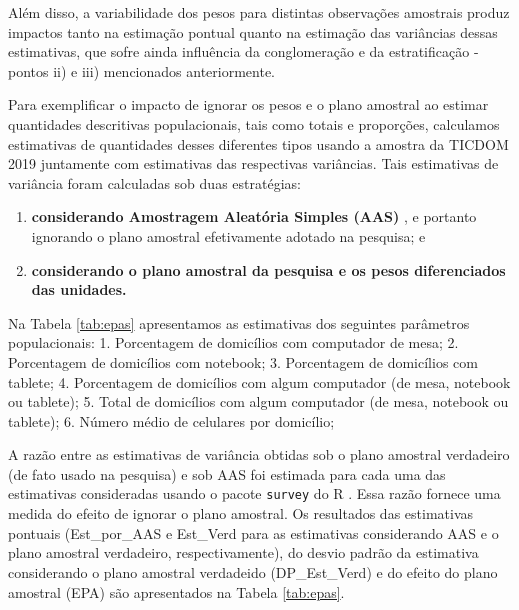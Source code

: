 \documentclass[
]{book}
\begin{document}
Além disso, a variabilidade dos pesos para distintas observações amostrais
produz impactos tanto na estimação pontual quanto na estimação das variâncias dessas estimativas, que sofre ainda influência da conglomeração e da estratificação - pontos ii) e iii) mencionados anteriormente.

Para exemplificar o impacto de ignorar os pesos e o plano amostral ao estimar quantidades descritivas populacionais, tais como totais e proporções, calculamos estimativas de quantidades desses diferentes tipos usando a amostra da TICDOM 2019 juntamente com estimativas das respectivas variâncias. Tais estimativas de variância foram calculadas sob duas estratégias:

\begin{enumerate}
\def\labelenumi{\alph{enumi})}
\item
  \textbf{considerando Amostragem Aleatória Simples (AAS)} , e portanto ignorando
  o plano amostral efetivamente adotado na pesquisa; e
\item
  \textbf{considerando o plano amostral da pesquisa e os pesos diferenciados das unidades.}
\end{enumerate}

Na Tabela \ref{tab:epas} apresentamos as estimativas dos seguintes parâmetros populacionais:
1. Porcentagem de domicílios com computador de mesa;
2. Porcentagem de domicílios com notebook;
3. Porcentagem de domicílios com tablete;
4. Porcentagem de domicílios com algum computador (de mesa, notebook ou tablete);
5. Total de domicílios com algum computador (de mesa, notebook ou tablete);
6. Número médio de celulares por domicílio;

A razão entre as estimativas de variância obtidas sob o plano amostral verdadeiro (de fato usado na pesquisa) e sob AAS foi estimada para cada uma
das estimativas consideradas usando o pacote \texttt{survey} do R \citep{R-survey}. Essa razão fornece uma medida do efeito de ignorar o plano amostral. Os resultados das estimativas pontuais (Est\_por\_AAS e Est\_Verd para as estimativas considerando AAS e o plano amostral verdadeiro, respectivamente), do desvio padrão da estimativa considerando o plano amostral verdadeido (DP\_Est\_Verd) e do efeito do plano amostral (EPA) são apresentados na Tabela \ref{tab:epas}.
\end{document}
